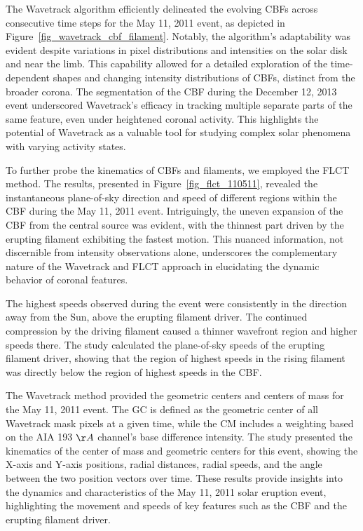 The Wavetrack algorithm efficiently delineated the evolving CBFs across consecutive time steps for the May 11, 2011 event, as depicted in Figure~\ref{fig_wavetrack_cbf_filament}. Notably, the algorithm's adaptability was evident despite variations in pixel distributions and intensities on the solar disk and near the limb. This capability allowed for a detailed exploration of the time-dependent shapes and changing intensity distributions of CBFs, distinct from the broader corona.
The segmentation of the CBF during the December 12, 2013 event underscored Wavetrack's efficacy in tracking multiple separate parts of the same feature, even under heightened coronal activity. This highlights the potential of Wavetrack as a valuable tool for studying complex solar phenomena with varying activity states.

To further probe the kinematics of CBFs and filaments, we employed the FLCT method. The results, presented in Figure~\ref{fig_flct_110511}, revealed the instantaneous plane-of-sky direction and speed of different regions within the CBF during the May 11, 2011 event. Intriguingly, the uneven expansion of the CBF from the central source was evident, with the thinnest part driven by the erupting filament exhibiting the fastest motion. This nuanced information, not discernible from intensity observations alone, underscores the complementary nature of the Wavetrack and FLCT approach in elucidating the dynamic behavior of coronal features.

The highest speeds observed during the event were consistently in the direction away from the Sun, above the erupting filament driver. The continued compression by the driving filament caused a thinner wavefront region and higher speeds there. The study calculated the plane-of-sky speeds of the erupting filament driver, showing that the region of highest speeds in the rising filament was directly below the region of highest speeds in the CBF.

The Wavetrack method provided the geometric centers and centers of mass for the May 11, 2011 event. The GC is defined as the geometric center of all Wavetrack mask pixels at a given time, while the CM includes a weighting based on the AIA 193 $\AA$ channel's base difference intensity. The study presented the kinematics of the center of mass and geometric centers for this event, showing the X-axis and Y-axis positions, radial distances, radial speeds, and the angle between the two position vectors over time.
These results provide insights into the dynamics and characteristics of the May 11, 2011 solar eruption event, highlighting the movement and speeds of key features such as the CBF and the erupting filament driver.

